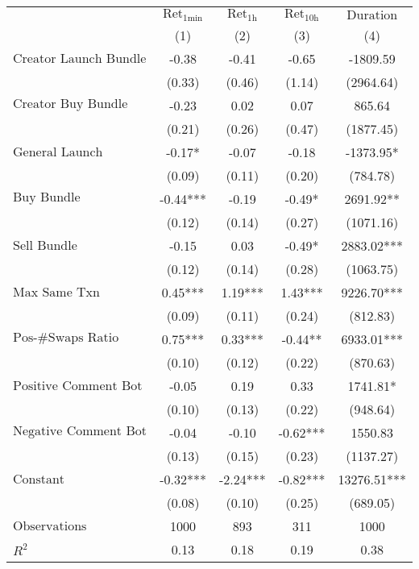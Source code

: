 \begin{tabular}{lcccc}
\hline
 & $\text{Ret}_{\text{1min}}$ & $\text{Ret}_{\text{1h}}$ & $\text{Ret}_{\text{10h}}$ & $\text{Duration}$ \\
 & (1) & (2) & (3) & (4)\\
\hline
$\text{Creator Launch Bundle}$ & -0.38 & -0.41 & -0.65 & -1809.59 \\
 & (0.33) & (0.46) & (1.14) & (2964.64) \\
$\text{Creator Buy Bundle}$ & -0.23 & 0.02 & 0.07 & 865.64 \\
 & (0.21) & (0.26) & (0.47) & (1877.45) \\
$\text{General Launch Bundle}$ & -0.17* & -0.07 & -0.18 & -1373.95* \\
 & (0.09) & (0.11) & (0.20) & (784.78) \\
$\text{Buy Bundle}$ & -0.44*** & -0.19 & -0.49* & 2691.92** \\
 & (0.12) & (0.14) & (0.27) & (1071.16) \\
$\text{Sell Bundle}$ & -0.15 & 0.03 & -0.49* & 2883.02*** \\
 & (0.12) & (0.14) & (0.28) & (1063.75) \\
$\text{Max Same Txn}$ & 0.45*** & 1.19*** & 1.43*** & 9226.70*** \\
 & (0.09) & (0.11) & (0.24) & (812.83) \\
$\text{Pos-\#Swaps Ratio}$ & 0.75*** & 0.33*** & -0.44** & 6933.01*** \\
 & (0.10) & (0.12) & (0.22) & (870.63) \\
$\text{Positive Comment Bot}$ & -0.05 & 0.19 & 0.33 & 1741.81* \\
 & (0.10) & (0.13) & (0.22) & (948.64) \\
$\text{Negative Comment Bot}$ & -0.04 & -0.10 & -0.62*** & 1550.83 \\
 & (0.13) & (0.15) & (0.23) & (1137.27) \\
$\text{Constant}$ & -0.32*** & -2.24*** & -0.82*** & 13276.51*** \\
 & (0.08) & (0.10) & (0.25) & (689.05) \\
$\text{Observations}$ & 1000 & 893 & 311 & 1000 \\
$R^2$ & 0.13 & 0.18 & 0.19 & 0.38 \\
\hline
\end{tabular}